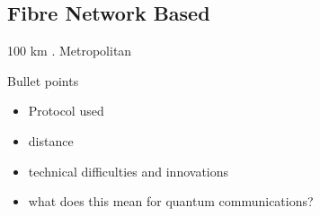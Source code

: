 \subsection{Fibre Network Based}
100 km \cite{Takesue:2015}. Metropolitan \cite{Valivarthi:2016}
\begin{mybox}{Bullet points}
    \begin{itemize}
        \item Protocol used
        \item distance
        \item technical difficulties and innovations
        \item what does this mean for quantum communications?
    \end{itemize}
\end{mybox} 
